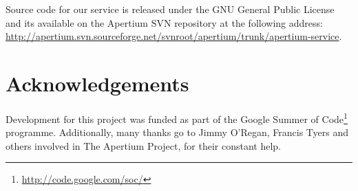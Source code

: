\documentclass[11pt]{article}
\begin{document}

Source code for our service is released under the GNU General Public License and its available on the Apertium SVN repository at the following address: \url{http://apertium.svn.sourceforge.net/svnroot/apertium/trunk/apertium-service}.

\section*{Acknowledgements}

Development for this project was funded as part of the Google Summer of Code\footnote{\url{http://code.google.com/soc/}} programme.
Additionally, many thanks go to Jimmy O'Regan, Francis Tyers and others involved in The Apertium Project, for their constant help.




\end{document}
